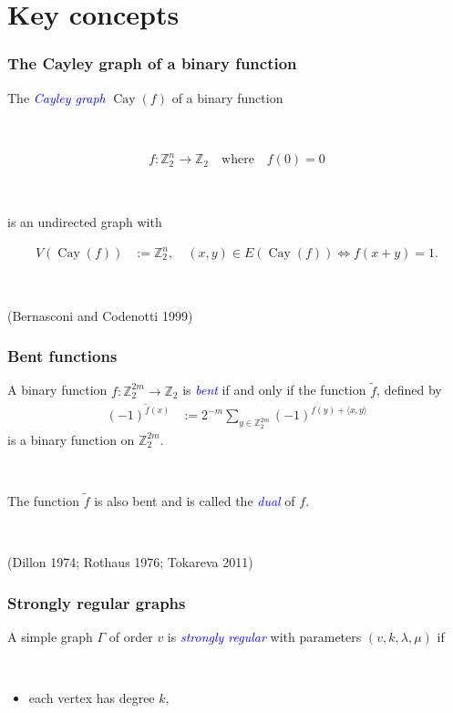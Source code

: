 \documentclass[pdf,sprung,slideColor,nocolorBG]{beamer}
\newenvironment{colortheme}[1]{
\def\ProvidesPackageRCS $##1${\relax}
\renewcommand{\ProcessOptions}{\relax}
\makeatletter

\makeatother
}{}
\newcommand{\slidecite}[1]{\tiny{(#1)}\normalsize{}}
\newcommand{\mb}[1]{\mathbb{#1}}
\newcommand{\Emph}[1]{\emph{\textcolor{blue}{#1}}}
\newcommand{\To}{\rightarrow}
\newcommand{\Cay}[1]{\operatorname{Cay}\left(#1\right)}
\newcommand{\dual}[1]{\widetilde{#1}}
\newcommand{\Z}{\mb{Z}}
\begin{document}
\section{Key concepts}
\begin{colortheme}{seagull}
\begin{frame}
\frametitle{The Cayley graph of a binary function}
The \Emph{Cayley graph} $\Cay{f}$ of a binary function 

~

\begin{align*}
%
f : \Z_2^n \To \Z_2 \quad \text{where} \quad f(0) = 0 
% 
\end{align*}

~

is 
an undirected graph with 

\begin{align*}
V(\Cay{f}) &:= \Z_2^n, \quad (x,y) \in E(\Cay{f}) \Leftrightarrow f(x+y) = 1.
\end{align*}

~

\slidecite{Bernasconi and Codenotti 1999}
\end{frame}
\begin{frame}
\frametitle{Bent functions}

A binary function  $f : \Z_2^{2m} \To \Z_2$ is \Emph{bent} if and only if the function $\dual{f}$, defined by
\begin{align*}
(-1)^{\dual{f}(x)} &:= 2^{-m} \sum_{y \in \Z_2^{2m}} (-1)^{f(y) + \langle x, y \rangle}
\end{align*}
is a binary function on $\Z_2^{2m}$.

~

The function $\dual{f}$ is also bent and is called the \Emph{dual} of $f$.

~

\slidecite{Dillon 1974; Rothaus 1976; Tokareva 2011}
\end{frame}

\begin{frame}
\frametitle{Strongly regular graphs}
A simple graph $\Gamma$ of order $v$ is \Emph{strongly regular} with parameters 
$(v,k,\lambda,\mu)$ if 

~

\begin{itemize}
 \item 
each vertex has degree $k,$ 


\end{itemize}
\end{frame}
\end{colortheme}
\end{document}
